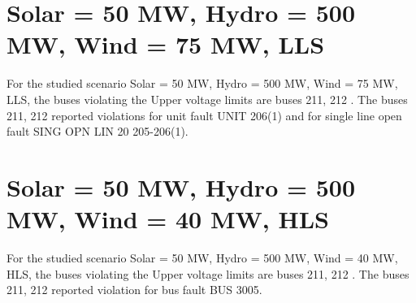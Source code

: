 \documentclass[10pt]{report}
\begin{document}
\section{Solar = 50 MW, Hydro = 500 MW, Wind = 75 MW, LLS}

For the studied scenario Solar = 50 MW, Hydro = 500 MW, Wind = 75 MW, LLS, the buses violating the Upper voltage limits are buses 211, 212 .
The buses 211, 212 reported violations for unit fault UNIT 206(1) and for single line open fault SING OPN LIN   20 205-206(1).
\begin{table}[H]
\caption{Contingencies reporting bus voltages greater than emergency voltage of 1.1 PU for scenario Solar = 50 MW, Hydro = 500 MW, Wind = 75 MW, LLS}
\label{HVSolar50MWHydro500MWWind75MWLLS}
\centering
{}
\end{table}

\section{Solar = 50 MW, Hydro = 500 MW, Wind = 40 MW, HLS}

For the studied scenario Solar = 50 MW, Hydro = 500 MW, Wind = 40 MW, HLS, the buses violating the Upper voltage limits are buses 211, 212 .
The buses 211, 212 reported violation for bus fault BUS 3005.
\begin{table}[H]
\caption{Contingencies reporting bus voltages greater than emergency voltage of 1.1 PU for scenario Solar = 50 MW, Hydro = 500 MW, Wind = 40 MW, HLS}
\label{HVSolar50MWHydro500MWWind40MWHLS}
\centering
{}
\end{table}
\end{document}

